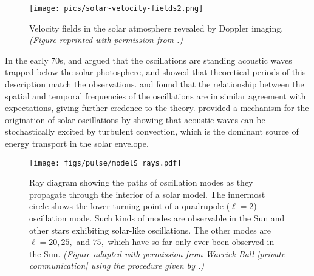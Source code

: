 \begin{figure}[t!]%
    \centering
    \texttt{[image: pics/solar-velocity-fields2.png]}
    \caption[Velocity fields in the solar atmosphere]{Velocity fields in the solar atmosphere revealed by Doppler imaging. %
    \emph{(Figure reprinted with permission from \citealt{1962ApJ...135..474L}.)}
    \label{fig:solar-velocity-fields}}
\end{figure}


In the early 70s, \citet{1970ApJ...162..993U} and \citet{1971ApL.....7..191L} argued that the oscillations are standing acoustic waves trapped below the solar photosphere, and showed that theoretical periods of this description match the observations. 
\citet{1975A&A....44..371D} and \citet{1977ApJ...218..901R} found that the relationship between the spatial and temporal frequencies of the oscillations are in similar agreement with expectations, giving further credence to the theory. 
\citet{1977ApJ...212..243G} provided a mechanism for the origination of solar oscillations by showing that acoustic waves can be stochastically excited by turbulent convection, which is the dominant source of energy transport in the solar envelope. 



\begin{figure}[t!]%
    \centering
    \vspace*{-0.35cm}
    \texttt{[image: figs/pulse/modelS\_rays.pdf]}
    \caption[Ray path diagram for solar oscillation modes]{Ray diagram showing the paths of oscillation modes as they propagate through the interior of a solar model. 
    The innermost circle shows the lower turning point of a quadrupole (${\ell=2}$) oscillation mode. 
    Such kinds of modes are observable in the Sun and other stars exhibiting solar-like oscillations. 
    The other modes are ${\ell=20}, 25,$ and $75,$ which have so far only ever been observed in the Sun. 
    \emph{(Figure adapted with permission from Warrick Ball [private communication] using the procedure given by \citealt{2000PhDT.........9G}.)}
    \label{fig:rays}}
\end{figure}


